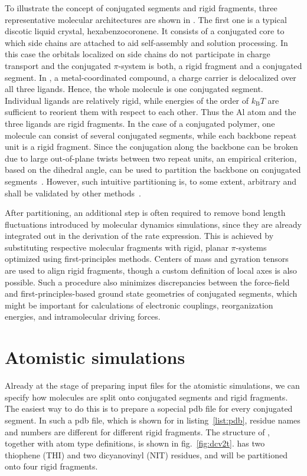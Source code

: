 To illustrate the concept of conjugated segments and rigid fragments, three representative molecular architectures are shown in . The first one is a typical discotic liquid crystal, hexabenzocoronene. It consists of a conjugated core to which side chains are attached to aid self-assembly and solution processing. In this case the orbitals localized on side chains do not participate in charge transport and the conjugated $\pi$-system is both, a rigid fragment and a conjugated segment. 
%
In \Alq, a metal-coordinated compound, a charge carrier is delocalized over all three ligands. Hence, the whole molecule is one conjugated segment. Individual ligands are relatively rigid, while energies of the order of $k_\text{B}T$ are sufficient to reorient them with respect to each other. Thus the Al atom and the three ligands are rigid fragments.
%
In the case of a conjugated polymer, one molecule can consist of several conjugated segments, while each backbone repeat unit is a rigid fragment. Since the conjugation along the backbone can be broken due to large out-of-plane twists between two repeat units, an empirical criterion, based on the dihedral angle, can be used to partition the backbone on conjugated segments~\cite{ruhle_multiscale_2010}. However, such intuitive partitioning is, to some extent, arbitrary and shall be validated by other methods~\cite{vukmirovic_charge_2008,vukmirovic_charge_2009,mcmahon_ad_2009}. 

After partitioning, an additional step is often required to remove bond length fluctuations introduced by molecular dynamics simulations, since they are already integrated out in the derivation of the rate expression. This is achieved by substituting respective molecular fragments with  rigid, planar $\pi$-systems optimized using first-principles methods. Centers of mass and gyration tensors are used to align rigid fragments, though a custom definition of local axes is also possible. Such a procedure also minimizes discrepancies between the force-field and first-principles-based ground state geometries of conjugated segments, which might be important for calculations of electronic couplings, reorganization energies, and intramolecular driving forces. 

\section{Atomistic simulations}
\label{sec:atomistic}
Already at the stage of preparing input files for the atomistic simulations, we can specify how molecules are split onto conjugated segments and rigid fragments. The easiest way to do this is to prepare a sopecial pdb file for every conjugated segment. In such a pdb file, which is shown for \dcvt in listing~\ref{list:pdb}, residue names and numbers are different for different rigid fragments. The structure of \dcvt, together with atom type definitions, is shown in fig.~\ref{fig:dcv2t}. \dcvt has two thiophene (THI) and two dicyanovinyl (NIT) residues, and will be partitioned onto four rigid fragments.

